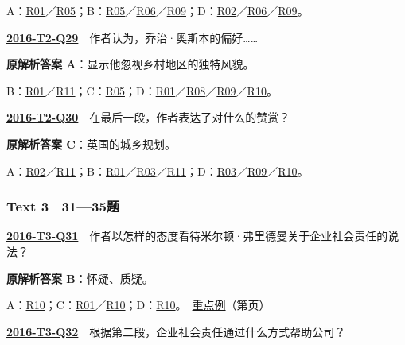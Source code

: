 \documentclass[11pt,a4paper]{article}
\begin{document}
\noindent A：\hyperref[cat-R01]{R01}／\hyperref[cat-R05]{R05}；B：\hyperref[cat-R05]{R05}／\hyperref[cat-R06]{R06}／\hyperref[cat-R09]{R09}；D：\hyperref[cat-R02]{R02}／\hyperref[cat-R06]{R06}／\hyperref[cat-R09]{R09}。\par\smallskip
{}\label{idx-2016-T2-Q29}\noindent\textbf{\href{https://zj139.github.io/math-notes/english/cace2d57f6e764744affd357/\#q29}{2016-T2-Q29}}　作者认为，乔治·奥斯本的偏好……\par\nopagebreak
\noindent\textbf{原解析答案 A}：显示他忽视乡村地区的独特风貌。\par\nopagebreak
\noindent B：\hyperref[cat-R01]{R01}／\hyperref[cat-R11]{R11}；C：\hyperref[cat-R05]{R05}；D：\hyperref[cat-R01]{R01}／\hyperref[cat-R08]{R08}／\hyperref[cat-R09]{R09}／\hyperref[cat-R10]{R10}。\par\smallskip
{}\label{idx-2016-T2-Q30}\noindent\textbf{\href{https://zj139.github.io/math-notes/english/cace2d57f6e764744affd357/\#q30}{2016-T2-Q30}}　在最后一段，作者表达了对什么的赞赏？\par\nopagebreak
\noindent\textbf{原解析答案 C}：英国的城乡规划。\par\nopagebreak
\noindent A：\hyperref[cat-R02]{R02}／\hyperref[cat-R11]{R11}；B：\hyperref[cat-R01]{R01}／\hyperref[cat-R03]{R03}／\hyperref[cat-R11]{R11}；D：\hyperref[cat-R03]{R03}／\hyperref[cat-R09]{R09}／\hyperref[cat-R10]{R10}。\par\smallskip
\clearpage
{}\subsubsection{Text 3　31—35题}
\label{idx-2016-T3-Q31}\noindent\textbf{\href{https://zj139.github.io/math-notes/english/b6f08ab4d489c8194307c00d/\#q31}{2016-T3-Q31}}　作者以怎样的态度看待米尔顿·弗里德曼关于企业社会责任的说法？\par\nopagebreak
\noindent\textbf{原解析答案 B}：怀疑、质疑。\par\nopagebreak
\noindent A：\hyperref[cat-R10]{R10}；C：\hyperref[cat-R01]{R01}／\hyperref[cat-R10]{R10}；D：\hyperref[cat-R10]{R10}。　\hyperref[case-2016-T3-Q31]{重点例}（第\pageref{case-2016-T3-Q31}页）\par\smallskip
{}\label{idx-2016-T3-Q32}\noindent\textbf{\href{https://zj139.github.io/math-notes/english/b6f08ab4d489c8194307c00d/\#q32}{2016-T3-Q32}}　根据第二段，企业社会责任通过什么方式帮助公司？\par\nopagebreak
\end{document}
